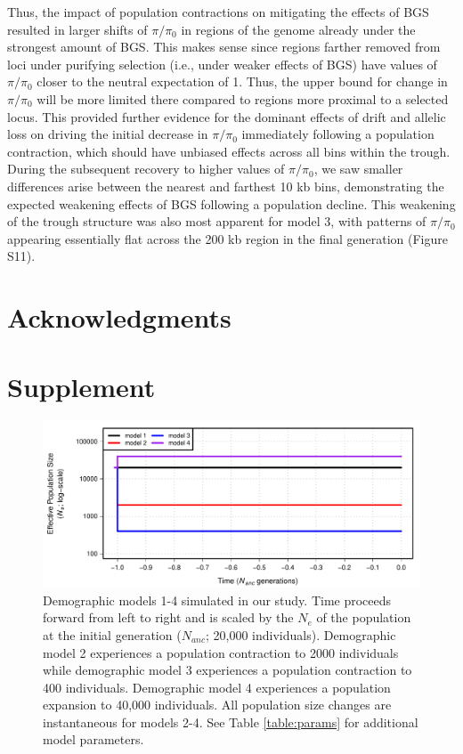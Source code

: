 \documentclass[9pt,twocolumn,twoside]{rilabRxiv}
\newcommand{\beginsupplement}{%
        \setcounter{table}{0}
        \renewcommand{\thetable}{S\arabic{table}}%
        \setcounter{figure}{0}
        \renewcommand{\thefigure}{S\arabic{figure}}%
     }
\begin{document}
Thus, the
impact of population contractions on mitigating the effects of BGS
resulted in larger shifts of $\pi/\pi_0$ in regions of the
genome already under the strongest amount of BGS.
This makes sense since regions farther removed from loci under purifying selection (i.e., under weaker effects of BGS) have values of $\pi/\pi_0$ closer to the neutral expectation of 1.
Thus, the upper bound for change in $\pi/\pi_0$ will be more limited there compared to regions more
proximal to a selected locus.
This provided further evidence for the dominant effects of
drift and allelic loss on driving the initial decrease in
$\pi/\pi_0$ immediately following a population contraction,
which should have unbiased effects across all bins within the trough.
During the subsequent recovery to higher values of $\pi/\pi_0$, we saw smaller differences arise
between the nearest and farthest 10 kb bins, demonstrating the expected
weakening effects of BGS following a population decline. This weakening
of the trough structure was also most apparent for model 3, with
patterns of $\pi/\pi_0$ appearing essentially flat across the
200 kb region in the final generation (Figure S11).

\section{Acknowledgments}




\onecolumn

\beginsupplement
\section*{Supplement}

\begin{figure}[h!]
\includegraphics[width=0.8\linewidth]{figures/FigS1.pdf}
\caption{Demographic models 1-4 simulated in our study.
Time proceeds forward from left to right and is scaled by the $N_e$ of the population at the initial generation ($N_{anc}$; 20,000 individuals).
Demographic model 2 experiences a population contraction to 2000 individuals while demographic model 3 experiences a population contraction to 400 individuals.
Demographic model 4 experiences a population expansion to 40,000 individuals.
All population size changes are instantaneous for models 2-4.
See Table \ref{table:params} for additional model parameters.}
\label{fig:models1}
\end{figure}
\pagebreak
\end{document}
